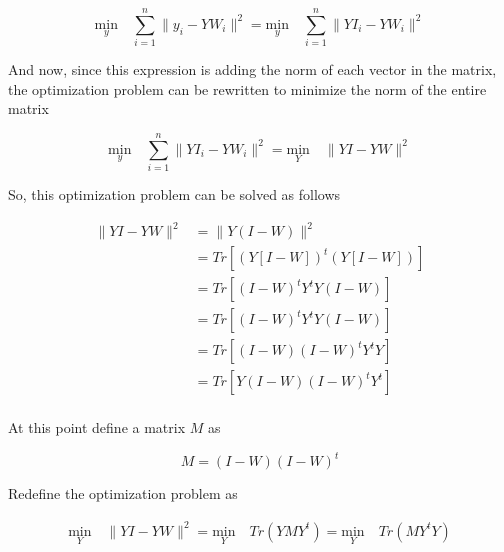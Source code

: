 \documentclass{article}
\begin{document}
    \begin{equation*}
            \underset{y}{\text{min}} \quad \sum_{i=1}^n \lVert y_i - Y W_i \rVert^2
            =
            \underset{y}{\text{min}} \quad \sum_{i=1}^n \lVert YI_i - Y W_i \rVert^2
    \end{equation*}

    And now, since this expression is adding the norm of each vector in the
    matrix, the optimization problem can be rewritten to minimize the norm of
    the entire matrix

    \begin{equation*}
            \underset{y}{\text{min}} \quad \sum_{i=1}^n \lVert YI_i - Y W_i \rVert^2
            =
            \underset{Y}{\text{min}} \quad \lVert YI - Y W \rVert^2
    \end{equation*}

    So, this optimization problem can be solved as follows

    \begin{equation*}
        \begin{aligned}
            \lVert Y I - Y W \rVert^2 &= \lVert Y (I - W) \rVert^2\\
            &= Tr[(Y [I-W])^t (Y [I-W])]\\
            &= Tr[(I-W)^t Y^t Y (I-W)]\\
            &= Tr[(I-W)^t Y^t Y (I-W)]\\
            &= Tr[(I-W) (I-W)^t Y^t Y]\\
            &= Tr[Y (I-W) (I-W)^t Y^t]\\
        \end{aligned}
    \end{equation*}

    At this point define a matrix $M$ as

    \begin{equation*}
        M = (I-W) (I-W)^t
    \end{equation*}

    Redefine the optimization problem as

    \begin{equation*}
        \begin{aligned}
            \underset{Y}{\text{min}} \quad \lVert YI - Y W \rVert^2
            = 
            \underset{Y}{\text{min}} \quad Tr(Y M Y^t)
            =
            \underset{Y}{\text{min}} \quad Tr(M Y^t Y)
        \end{aligned}
    \end{equation*}
\end{document}
